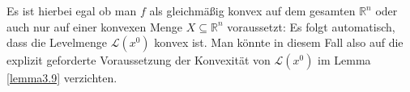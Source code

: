 \documentclass[a4paper,reqno]{amsart}
\newtheorem{lemma}[theorem]{Lemma}
\newtheorem{satz}[theorem]{Satz}
\newtheorem{bemerkung}[theorem]{Bemerkung}
\theoremstyle{definition}
\theoremstyle{remark}
\newcommand\norm[1]{\left\lVert#1\right\rVert}
\newcommand\red[1]{\textcolor{red}{#1}}
\begin{document}
    Es ist hierbei egal ob man $f$ als gleichmäßig konvex auf dem
    gesamten $\mathbb{R}^n$ oder auch nur auf einer konvexen Menge
    $X\subseteq\mathbb{R}^n$ voraussetzt: Es folgt automatisch, dass
    die Levelmenge $\mathscr{L}(x^0)$ konvex ist. Man könnte in diesem
    Fall also auf die explizit geforderte Voraussetzung der Konvexität
    von $\mathscr{L}(x^0)$ im Lemma \ref{lemma3.9} verzichten.






\end{document}
